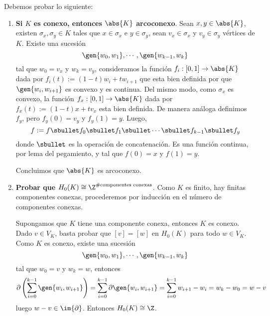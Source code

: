 \documentclass{article}
\begin{document}
\vspace{2mm}
\noindent Debemos probar lo siguiente:
\begin{enumerate}
    \item \textbf{Si $K$ es conexo, entonces $\abs{K}$ arcoconexo}. Sean $x,y\in\abs{K}$, 
    existen $\sigma_{x},\sigma_{y}\in K$ tales que $x\in\sigma_{x}$ e $y\in\sigma_{y}$, sean 
    $v_{x}\in\sigma_{x}$ y $v_{y}\in\sigma_{y}$ vértices de $K$. Existe una sucesión
    \begin{equation*}
        \gen{w_{0},w_{1}},\cdots,\gen{w_{k-1},w_{k}}
    \end{equation*}
    tal que $w_{0}=v_{x}$ y $w_{k}=v_{y}$, consideramos la función $f_{i}:[0,1]\to\abs{K}$ dada 
    por $f_{i}(t):=(1-t)w_{i}+tw_{i+1}$ que esta bien definida por que $\gen{w_{i},w_{i+1}}$ es 
    convexo y es continua. Del mismo modo, como $\sigma_{x}$ es convexo, la función 
    $f_{x}:[0,1]\to\abs{K}$ dada por $f_{x}(t):=(1-t)x+tv_{x}$ esta bien definida. De manera
    análoga definimos $f_{y}$, pero $f_{y}(0)=v_{y}$ y $f_{y}(1)=y$. Luego,
    \begin{equation*}
        f:=f\sbullet f_{0}\sbullet f_{1}\sbullet\cdots\sbullet f_{k-1}\sbullet f_{y}
    \end{equation*}
    donde $\sbullet$ es la operación de concatenación. Es una función continua, por lema del 
    pegamiento, y tal que $f(0)=x$ y $f(1)=y$.
    
    \vspace{1mm}
    Concluimos que $\abs{K}$ es arcoconexo.

    \item \textbf{Probar que $H_{0}(K)\cong\Z^{\text{\#componentes conexas}}$}. Como $K$ es 
    finito, hay finitas componentes conexas, procederemos por inducción en el número de 
    componentes conexas.

    \vspace{1mm}
    Supongamos que $K$ tiene una componente conexa, entonces $K$ es conexo. Dado $v\in V_{K}$, 
    basta probar que $[v]=[w]$ en $H_{0}(K)$ para todo $w\in V_{K}$. Como $K$ es conexo, existe
    una sucesión
    \begin{equation*}
        \gen{w_{0},w_{1}},\cdots,\gen{w_{k-1},w_{k}}
    \end{equation*}
    tal que $w_{0}=v$ y $w_{k}=w$, entonces
    \begin{equation*}
        \partial\left(\sum_{i=0}^{k-1}\gen{w_{i},w_{i+1}}\right)
        =\sum_{i=0}^{k-1}\partial\gen{w_{i},w_{i+1}}=\sum_{i=0}^{k-1}w_{i+1}-w_{i}=w_{k}-w_{0}=w-v
    \end{equation*}
    luego $w-v\in\im{\partial}$. Entonces $H_{0}(K)\cong\Z$.


\end{enumerate}
\end{document}
